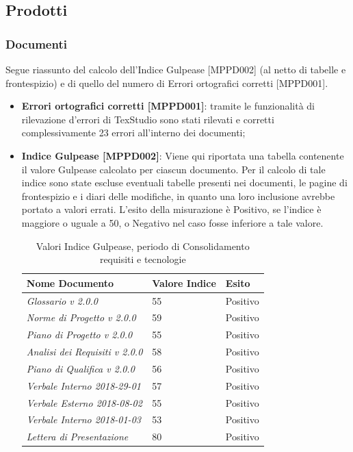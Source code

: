 \documentclass[openany,12pt,a4paper]{report}
\begin{document}
\subsection{Prodotti}

\subsubsection{Documenti}

Segue riassunto del calcolo dell'Indice Gulpease [MPPD002] (al netto di tabelle e frontespizio) e di quello del numero di Errori ortografici corretti [MPPD001].

\begin{itemize}
	\item \textbf{Errori ortografici corretti [MPPD001]}: tramite le funzionalità di rilevazione d'errori di TexStudio sono stati rilevati e corretti complessivamente 23 errori all'interno dei documenti;
	
	\item \textbf{Indice Gulpease [MPPD002]}: Viene qui riportata una tabella contenente il valore Gulpease calcolato per ciascun documento.
	Per il calcolo di tale indice sono state escluse eventuali tabelle presenti nei documenti, le pagine di frontespizio e i diari delle modifiche, in quanto una loro inclusione avrebbe portato a valori errati. L'esito della misurazione è Positivo, se l'indice è maggiore o uguale a 50, o Negativo nel caso fosse inferiore a tale valore.
	
	\begin{table}[h]
		\begin{center}
			\setlength\LTleft{6mm}
			\begin{longtable}{|p{60mm}|p{30mm}|p{25mm}|}
				\hline  
				\textbf{Nome Documento} & \textbf{Valore Indice} & \textbf{Esito} \\ \hline    
				\textit{Glossario v 2.0.0} & 55 & Positivo\\ \hline    
				\textit{Norme di Progetto v 2.0.0} & 59 & Positivo\\ \hline    
				\textit{Piano di Progetto v 2.0.0} & 55 & Positivo\\ \hline    
				\textit{Analisi dei Requisiti v 2.0.0} & 58 & Positivo\\ \hline    
				\textit{Piano di Qualifica v 2.0.0} & 56 & Positivo\\ \hline    
				\textit{Verbale Interno 2018-29-01} & 57 & Positivo\\ \hline
				\textit{Verbale Esterno 2018-08-02} & 55 & Positivo\\ \hline
				\textit{Verbale Interno 2018-01-03} & 53 & Positivo\\ \hline    
				\textit{Lettera di Presentazione} & 80 & Positivo\\ \hline
			\end{longtable}
		\end{center}
		\caption{Valori Indice Gulpease, periodo di Consolidamento requisiti e tecnologie} 
	\end{table} 
	

\end{itemize}
\end{document}
